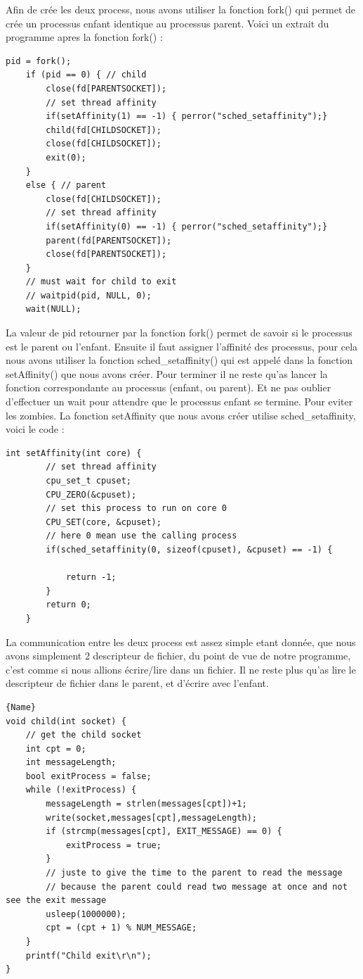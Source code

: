 \documentclass[
	a4paper, %
	10pt, %
]{CSUniSchoolLabReport}
\begin{document}
Afin de crée les deux process, nous avons utiliser la fonction fork() qui permet de crée un processus enfant identique au processus parent.
Voici un extrait du programme apres la fonction fork() :
\begin{lstlisting}[style=CStyle, firstnumber=1]
	pid = fork();
    if (pid == 0) { // child 
        close(fd[PARENTSOCKET]); 
        // set thread affinity
        if(setAffinity(1) == -1) { perror("sched_setaffinity");}
        child(fd[CHILDSOCKET]);
        close(fd[CHILDSOCKET]);
        exit(0);
    }
    else { // parent 
        close(fd[CHILDSOCKET]);
        // set thread affinity
        if(setAffinity(0) == -1) { perror("sched_setaffinity");}
        parent(fd[PARENTSOCKET]);
        close(fd[PARENTSOCKET]);
    }
    // must wait for child to exit
    // waitpid(pid, NULL, 0);
    wait(NULL);
\end{lstlisting}
La valeur de pid retourner par la fonction fork() permet de savoir si le processus est le parent ou l'enfant.
Ensuite il faut assigner l'affinité des processus, pour cela nous avons utiliser la fonction sched\_setaffinity() qui est appelé dans la fonction setAffinity() que nous avons créer.
Pour terminer il ne reste qu'as lancer la fonction correspondante au processus (enfant, ou parent).
Et ne pas oublier d'effectuer un wait pour attendre que le processus enfant se termine. Pour eviter les zombies.
La fonction setAffinity que nous avons créer utilise sched\_setaffinity, voici le code : \\
\begin{lstlisting}[style=CStyle, firstnumber=1]
	int setAffinity(int core) {
		// set thread affinity
		cpu_set_t cpuset;
		CPU_ZERO(&cpuset);
		// set this process to run on core 0
		CPU_SET(core, &cpuset);
		// here 0 mean use the calling process
		if(sched_setaffinity(0, sizeof(cpuset), &cpuset) == -1) {
	
			return -1;
		}
		return 0;
	}
\end{lstlisting}
La communication entre les deux process est assez simple etant donnée, que nous avons simplement 2 descripteur de fichier, du point de vue de notre programme, c'est comme si nous allions écrire/lire dans un fichier.
Il ne reste plus qu'as lire le descripteur de fichier dans le parent, et d'écrire avec l'enfant.\\
\noindent\begin{minipage}{.50\textwidth}
\begin{lstlisting}[style=CStyle, caption=Processus Enfant, firstnumber=1]{Name}
void child(int socket) {
	// get the child socket
	int cpt = 0;
	int messageLength;
	bool exitProcess = false;
	while (!exitProcess) {
		messageLength = strlen(messages[cpt])+1;
		write(socket,messages[cpt],messageLength);
		if (strcmp(messages[cpt], EXIT_MESSAGE) == 0) {
			exitProcess = true;
		}
		// juste to give the time to the parent to read the message
		// because the parent could read two message at once and not see the exit message
		usleep(1000000); 
		cpt = (cpt + 1) % NUM_MESSAGE;
	}
	printf("Child exit\r\n");
}
\end{lstlisting}
\end{minipage}\hfill
\end{document}
